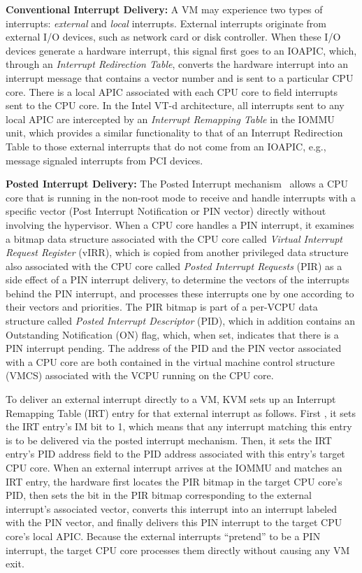 {\bf Conventional Interrupt Delivery:}
A VM may experience two types of interrupts: {\em external} and {\em local} interrupts.
External interrupts originate from external I/O devices, such as network card or disk controller.
When these I/O devices generate a hardware interrupt, this signal first goes to an IOAPIC, which, through an {\em Interrupt Redirection Table},
converts the hardware interrupt into an interrupt message that contains a vector number and is sent to a particular CPU core.
There is a local APIC associated with each CPU core to field interrupts sent to the CPU core.
In the Intel VT-d architecture, all interrupts sent to any local APIC are intercepted by  an {\em Interrupt Remapping Table} in the IOMMU unit,
which provides a similar functionality to that of an Interrupt Redirection Table
to those external interrupts that do not come from an IOAPIC, e.g., message signaled interrupts from PCI devices.

{\bf Posted Interrupt Delivery:}
The Posted Interrupt mechanism~\cite{intelvtd-paper,intelvtd-manual} allows a CPU core that is running in the non-root mode to receive and handle interrupts with a specific vector
(Post Interrupt Notification or PIN vector) directly without involving the hypervisor.
When a CPU core handles a PIN interrupt, it examines a bitmap data structure associated with the CPU core called {\em Virtual Interrupt Request Register} (vIRR),
which is copied from another privileged data structure also associated with the CPU core called {\em Posted Interrupt Requests} (PIR) as a side effect of a PIN interrupt delivery,
to determine the vectors of the interrupts behind the PIN interrupt, and processes these interrupts one by one according to their vectors and priorities.
The PIR bitmap is part of a per-VCPU data structure called {\em Posted Interrupt Descriptor} (PID), which in addition contains an Outstanding Notification (ON) flag, which, when set, indicates that there is a PIN interrupt pending.
The address of the PID and the PIN vector associated with a CPU core are both contained in the virtual machine control structure (VMCS) associated with the VCPU running on the CPU core.


To deliver an external interrupt directly to a VM, KVM sets up an Interrupt Remapping Table (IRT) entry for that external interrupt as follows.
First , it sets the IRT entry's IM bit to 1, which means that any interrupt matching this entry is to be delivered via the posted interrupt mechanism.
Then, it sets the IRT entry's PID address field to the PID address associated with this entry's target CPU core.
When an external interrupt arrives at the IOMMU and matches an IRT entry, the
hardware first locates the PIR bitmap in the target CPU core's PID, then sets the bit in the PIR bitmap corresponding to the external interrupt's associated vector,
converts this interrupt into an interrupt labeled with the PIN vector, and finally delivers this PIN interrupt to the target CPU core's local APIC.
Because the external interrupts ``pretend'' to be a PIN interrupt, the target CPU core processes them directly without causing any VM exit.

